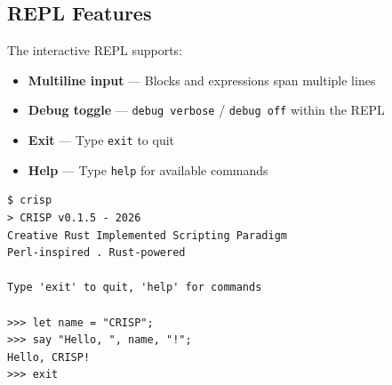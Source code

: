 \subsection{REPL Features}

The interactive REPL supports:

\begin{itemize}
    \item \textbf{Multiline input} — Blocks and expressions span multiple lines
    \item \textbf{Debug toggle} — \texttt{debug verbose} / \texttt{debug off} within the REPL
    \item \textbf{Exit} — Type \texttt{exit} to quit
    \item \textbf{Help} — Type \texttt{help} for available commands
\end{itemize}

\begin{tcolorbox}[colback=codebg, colframe=darkpurple, colbacktitle=darkpurple, title=\textbf{\textcolor{codegold}{REPL Session}}, fonttitle=\bfseries, sharp corners]
\begin{lstlisting}
$ crisp
> CRISP v0.1.5 - 2026
Creative Rust Implemented Scripting Paradigm
Perl-inspired . Rust-powered

Type 'exit' to quit, 'help' for commands

>>> let name = "CRISP";
>>> say "Hello, ", name, "!";
Hello, CRISP!
>>> exit
\end{lstlisting}
\end{tcolorbox}
